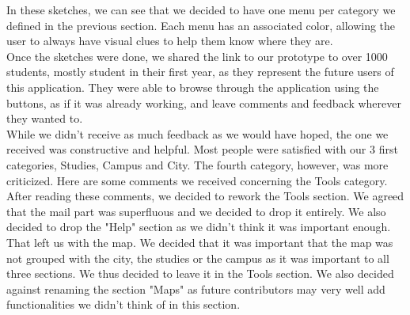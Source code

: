 \documentclass[11pt, a4paper]{report}
\begin{document}
In these sketches, we can see that we decided to have one menu per category we defined in the previous section. Each menu has an associated color, allowing the user to always have visual clues to help them know where they are.\\

Once the sketches were done, we shared the link to our prototype to over 1000 students, mostly student in their first year, as they represent the future users of this application. They were able to browse through the application using the buttons, as if it was already working, and leave comments and feedback wherever they wanted to.\\

While we didn't receive as much feedback as we would have hoped, the one we received was constructive and helpful. Most people were satisfied with our 3 first categories, Studies, Campus and City. The fourth category, however, was more criticized. Here are some comments we received concerning the Tools category.\\

After reading these comments, we decided to rework the Tools section. We agreed that the mail part was superfluous and we decided to drop it entirely. We also decided to drop the "Help" section as we didn't think it was important enough. That left us with the map. We decided that it was important that the map was not grouped with the city, the studies or the campus as it was important to all three sections. We thus decided to leave it in the Tools section. We also decided against renaming the section "Maps" as future contributors may very well add functionalities we didn't think of in this section.
\end{document}
